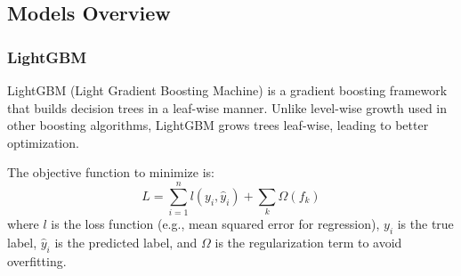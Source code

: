 

\subsection{Models Overview}

\subsubsection{LightGBM}
LightGBM (Light Gradient Boosting Machine) is a gradient boosting framework that builds decision trees in a leaf-wise manner. Unlike level-wise growth used in other boosting algorithms, LightGBM grows trees leaf-wise, leading to better optimization.

The objective function to minimize is:
\begin{equation*}
L = \sum_{i=1}^{n} l(y_i, \hat{y}_i) + \sum_{k} \Omega(f_k)
\end{equation*}
where $l$ is the loss function (e.g., mean squared error for regression), $y_i$ is the true label, $\hat{y}_i$ is the predicted label, and $\Omega$ is the regularization term to avoid overfitting.

